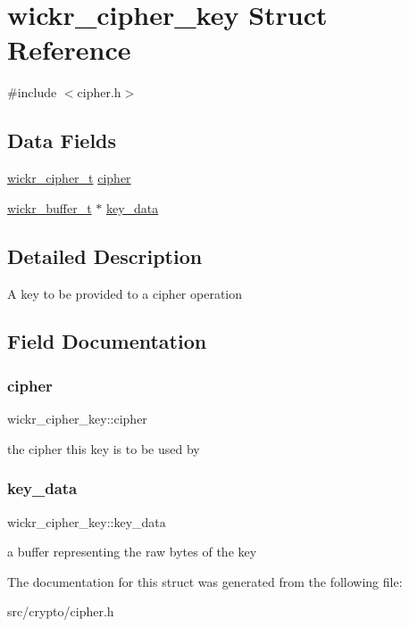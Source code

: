 \hypertarget{structwickr__cipher__key}{}\section{wickr\+\_\+cipher\+\_\+key Struct Reference}
\label{structwickr__cipher__key}


{\ttfamily \#include $<$cipher.\+h$>$}

\subsection*{Data Fields}
\begin{DoxyCompactItemize}
\item 
\hyperlink{structwickr__cipher}{wickr\+\_\+cipher\+\_\+t} \hyperlink{structwickr__cipher__key_a6506e1a07f7bc2c5ceeb0ca5ce81385b}{cipher}
\item 
\hyperlink{structwickr__buffer}{wickr\+\_\+buffer\+\_\+t} $\ast$ \hyperlink{structwickr__cipher__key_a0bf9fa22f1db80010410ae609aac8a2a}{key\+\_\+data}
\end{DoxyCompactItemize}


\subsection{Detailed Description}
A key to be provided to a cipher operation 

\subsection{Field Documentation}
\mbox{\label{structwickr__cipher__key_a6506e1a07f7bc2c5ceeb0ca5ce81385b}} 
\subsubsection{\texorpdfstring{cipher}{cipher}}
{\footnotesize\ttfamily wickr\+\_\+cipher\+\_\+key\+::cipher}

the cipher this key is to be used by \mbox{\label{structwickr__cipher__key_a0bf9fa22f1db80010410ae609aac8a2a}} 
\subsubsection{\texorpdfstring{key\+\_\+data}{key\_data}}
{\footnotesize\ttfamily wickr\+\_\+cipher\+\_\+key\+::key\+\_\+data}

a buffer representing the raw bytes of the key 

The documentation for this struct was generated from the following file\+:\begin{DoxyCompactItemize}
\item 
src/crypto/cipher.\+h\end{DoxyCompactItemize}
